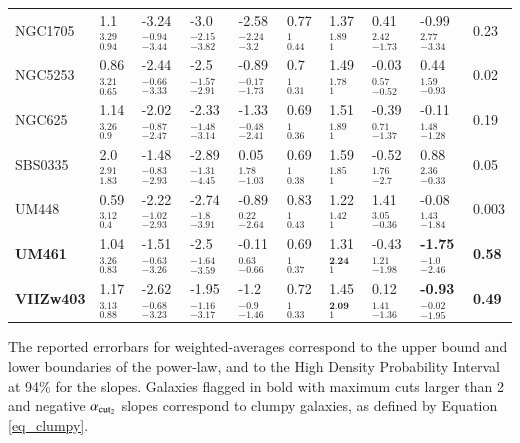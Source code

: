 \documentclass{aa}
\begin{document}
\begin{appendix}
\begin{table}[h!]
\begin{threeparttable}
\begin{tabular}{|p{}|p{}p{}p{}p{}|p{}p{}p{}p{}|p{}|}
NGC1705&1.1$_{0.94}^{3.29}$&-3.24$_{-3.44}^{-0.94}$&-3.0$_{-3.82}^{-2.15}$&-2.58$_{-3.2}^{-2.24}$&0.77$_{0.44}^{1}$&1.37$_{1}^{1.89}$
&0.41$_{-1.73}^{2.42}$&-0.99$_{-3.34}^{2.77}$&0.23\\
NGC5253&0.86$_{0.65}^{3.21}$&-2.44$_{-3.33}^{-0.66}$&-2.5$_{-2.91}^{-1.57}$&-0.89$_{-1.73}^{-0.17}$&0.7$_{0.31}^{1}$&1.49$_{1}^{1.78}$
&-0.03$_{-0.52}^{0.57}$&0.44$_{-0.93}^{1.59}$&0.02\\
NGC625&1.14$_{0.9}^{3.26}$&-2.02$_{-2.47}^{-0.87}$&-2.33$_{-3.14}^{-1.48}$&-1.33$_{-2.41}^{-0.48}$&0.69$_{0.36}^{1}$&1.51$_{1}^{1.89}$&-0.39$_{-1.37}^{0.71}$&-0.11$_{-1.28}^{1.48}$&0.19\\
SBS0335&2.0$_{1.83}^{2.91}$&-1.48$_{-2.93}^{-0.83}$&-2.89$_{-4.45}^{-1.31}$&0.05$_{-1.03}^{1.78}$&0.69$_{0.38}^{1}$&1.59$_{1}^{1.85}$&-0.52$_{-2.7}^{1.76}$&0.88$_{-0.33}^{2.36}$&0.05\\
UM448&0.59$_{0.4}^{3.12}$&-2.22$_{-2.93}^{-1.02}$&-2.74$_{-3.91}^{-1.8}$&-0.89$_{-2.64}^{0.22}$&0.83$_{0.43}^{1}$&1.22$_{1}^{1.42}$&1.41$_{-0.36}^{3.05}$&-0.08$_{-1.84}^{1.43}$&0.003\\
\textbf{UM461}&1.04$_{0.83}^{3.26}$&-1.51$_{-3.26}^{-0.63}$&-2.5$_{-3.59}^{-1.64}$&-0.11$_{-0.66}^{0.63}$&0.69$_{0.37}^{1}$&1.31$_{1}^{\textbf{2.24}}$&-0.43$_{-1.98}^{1.21}$&\textbf{-1.75}$_{-2.46}^{-1.0}$&\textbf{0.58}\\
\textbf{VIIZw403}&1.17$_{0.88}^{3.13}$&-2.62$_{-3.23}^{-0.68}$&-1.95$_{-3.17}^{-1.16}$&-1.2$_{-1.46}^{-0.9}$&0.72$_{0.33}^{1}$&1.45$_{1}^{\textbf{2.09}}$&0.12$_{-1.36}^{1.41}$&\textbf{-0.93}$_{-1.95}^{-0.02}$&\textbf{0.49}\\
\hline
\end{tabular}
\begin{tablenotes}
   \footnotesize
   \item The reported errorbars for weighted-averages correspond to the upper bound and lower boundaries of the power-law, and to the High Density Probability Interval at 94\% for the slopes. Galaxies flagged in bold with maximum cuts larger than 2 and negative $\alpha_{\rm cut_2}$ slopes correspond to clumpy galaxies, as defined by Equation \ref{eq_clumpy}.
\end{tablenotes}
\end{threeparttable}
\end{table}

\begin{table}[h!]
\label{table_pnsigma}
\begin{threeparttable}
\caption[P(3$\sigma$) for all lines, PDR lines, and CO(1-0) line]{P(3$\sigma$) probabilities and averaged p-values for the power-law models, multicomponent and single component.}
\label{3sigma_values}


\end{threeparttable}
\end{table}
\end{appendix}
\end{document}
